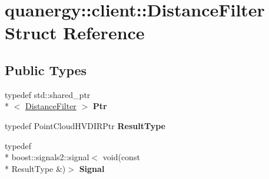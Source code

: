 \hypertarget{structquanergy_1_1client_1_1DistanceFilter}{\section{quanergy\-:\-:client\-:\-:Distance\-Filter Struct Reference}
\label{structquanergy_1_1client_1_1DistanceFilter}
}
\subsection*{Public Types}
\begin{DoxyCompactItemize}
\item 
\hypertarget{structquanergy_1_1client_1_1DistanceFilter_a50f0687f568ce3ebcb3ede06f1682a11}{typedef std\-::shared\-\_\-ptr\\*
$<$ \hyperlink{structquanergy_1_1client_1_1DistanceFilter}{Distance\-Filter} $>$ {\bfseries Ptr}}\label{structquanergy_1_1client_1_1DistanceFilter_a50f0687f568ce3ebcb3ede06f1682a11}

\item 
\hypertarget{structquanergy_1_1client_1_1DistanceFilter_a592ba10aafe5178333c6ea0001c9e760}{typedef Point\-Cloud\-H\-V\-D\-I\-R\-Ptr {\bfseries Result\-Type}}\label{structquanergy_1_1client_1_1DistanceFilter_a592ba10aafe5178333c6ea0001c9e760}

\item 
\hypertarget{structquanergy_1_1client_1_1DistanceFilter_a95ae0d3f4bc572a61bf85a805448210b}{typedef \\*
boost\-::signals2\-::signal$<$ void(const \\*
Result\-Type \&)$>$ {\bfseries Signal}}\label{structquanergy_1_1client_1_1DistanceFilter_a95ae0d3f4bc572a61bf85a805448210b}

\end{DoxyCompactItemize}
